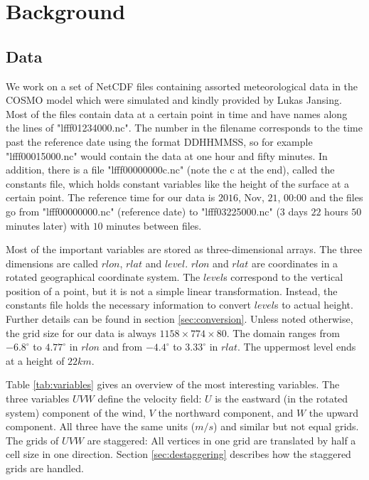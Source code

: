 \setcounter{chapter}{1}

\chapter{Background}
\section{Data}\label{sec:data}
We work on a set of NetCDF files containing assorted meteorological data in the COSMO model which were simulated and kindly provided by Lukas Jansing. Most of the files contain data at a certain point in time and have names along the lines of "lfff01234000.nc". The number in the filename corresponds to the time past the reference date using the format DDHHMMSS, so for example "lfff00015000.nc" would contain the data at one hour and fifty minutes. In addition, there is a file "lfff00000000c.nc" (note the c at the end), called the constants file, which holds constant variables like the height of the surface at a certain point. The reference time for our data is $2016$, Nov, $21$, $00$:$00$ and the files go from "lfff00000000.nc" (reference date) to "lfff03225000.nc" ($3$ days $22$ hours $50$ minutes later) with $10$ minutes between files.

Most of the important variables are stored as three-dimensional arrays. The three dimensions are called $rlon$, $rlat$ and $level$. $rlon$ and $rlat$ are coordinates in a rotated geographical coordinate system. The $level$s correspond to the vertical position of a point, but it is not a simple linear transformation. Instead, the constants file holds the necessary information to convert $level$s to actual height. Further details can be found in section \ref{sec:conversion}. Unless noted otherwise, the grid size for our data is always $1158 \times 774 \times 80$. The domain ranges from $-6.8^{\circ}$ to $4.77^{\circ}$ in $rlon$ and from $-4.4^{\circ}$ to $3.33^{\circ}$ in $rlat$. The uppermost level ends at a height of $22 km$.

Table \ref{tab:variables} gives an overview of the most interesting variables. The three variables $UVW$ define the velocity field: $U$ is the eastward (in the rotated system) component of the wind, $V$ the northward component, and $W$ the upward component. All three have the same units ($m/s$) and similar but not equal grids. The grids of $UVW$ are staggered: All vertices in one grid are translated by half a cell size in one direction. Section \ref{sec:destaggering} describes how the staggered grids are handled.

